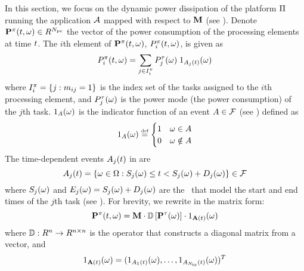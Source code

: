 In this section, we focus on the dynamic power dissipation of the platform $\Pi$ running the application $\mathcal{A}$ mapped with respect to $\mathbf{M}$ (see ). Denote $\mathbf{P}^\pi(t, \omega) \in R^{N_\text{pe}}$ the vector of the power consumption of the processing elements at time $t$. The $i$th element of $\mathbf{P}^\pi(t, \omega)$, $P^\pi_i(t, \omega)$, is given as
\begin{equation} \elabel{processor-power}
  \PP_i(\t, \o) = \sum_{j \in \index^\pi_i} \PT_j(\o) \; \I_{\event_j(\t)}(\o)
\end{equation}
where $I^\pi_i = \{ j: m_{ij} = 1 \}$ is the index set of the tasks assigned to the $i$th processing element, and $P^\tau_j(\omega)$ is the power mode (the power consumption) of the $j$th task. $1_A(\omega)$ is the indicator function of an event $A \in \mathcal{F}$ (see ) defined as
\[
  \I_A(\o) \eqdef \begin{cases}
      1 & \o \in \event \\
      0 & \o \notin \event
    \end{cases}
\]
The time-dependent events $A_j(t)$ in  are
\[
  A_j(t) = \{ \omega \in \Omega: S_j(\omega) \leq t < S_j(\omega) + D_j(\omega) \} \in \mathcal{F}
\]
where $S_j(\omega)$ and $E_j(\omega) = S_j(\omega) + D_j(\omega)$ are the \rvs\ that model the start and end times of the $j$th task (see ). For brevity, we rewrite  in the matrix form:
\[
  \vPP(\t, \o) = \mM \cdot \oD{\vPT(\o)} \cdot \I_{\m{\event}(\t)}(\o)
\]
where $\oD: \real^n \to \real^{n \times n}$ is the operator that constructs a diagonal matrix from a vector, and
\[
  1_{\mathbf{A}(t)}(\omega) = (1_{A_1(t)}(\omega), \dots, 1_{A_{N_\text{ts}}(t)}(\omega))^T
\]
